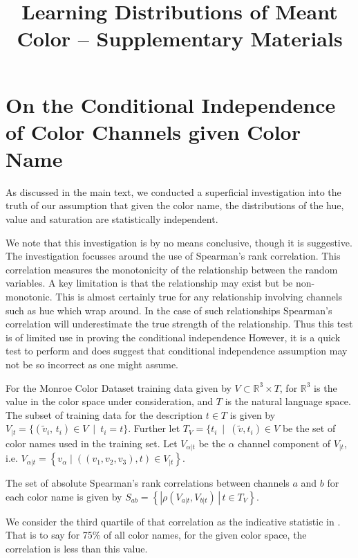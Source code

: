 \documentclass[11pt,letterpaper]{article}
\title{Learning Distributions of Meant Color -- Supplementary Materials}
\author{}
\date{}
\begin{document}
\maketitle

\section{On the Conditional Independence of Color Channels given Color Name}

As discussed in the main text, we conducted a superficial investigation into the truth of our assumption that given the color name, the distributions of the hue, value and saturation are statistically independent.

We note that this investigation is by no means conclusive, though it is suggestive.
The investigation focusses around the use of Spearman's rank correlation.
This correlation measures the monotonicity of the relationship between the random variables.
A key limitation is that the relationship may exist but be non-monotonic.
This is almost certainly true for any relationship involving channels such as hue which wrap around.
In the case of such relationships Spearman's correlation will underestimate the true strength of the relationship.
Thus this test is of limited use in proving the conditional independence
However, it is a quick test to perform and does suggest that conditional independence assumption may not be so incorrect as one might assume.


For the Monroe Color Dataset training data  given by $V \subset \mathbb{R}^{3}\times T$, for $\mathbb{R}^{3}$ is the value in the color space under consideration, and $T$ is the natural language space.
The subset of training data for the description $t \in T$ is given by
$V_{|t}=\{(\tilde{v}_i,\,t_i) \in V \: \mid \: t_{i}=t\}$.
Further let $T_V = \{t_i \: \mid \: (\tilde{v},t_i)\in V$ be the set of color names used in the training set.
Let $V_{\alpha|t}$ be the $\alpha$ channel component of $V_{|t}$, i.e. $V_{\alpha|t} = \left\lbrace v_\alpha \mid ((v_1,v_2,v_3), t) \in V_{|t} \right\rbrace$.

The set of absolute Spearman's rank correlations between channels $a$ and $b$ for each color name is given by
$S_{ab}=\left\lbrace \left|\rho(V_{a|t},V_{b|t})\,\right|\,t\in T_{V}\right\rbrace$.

We consider the third quartile of that correlation as the indicative statistic in .
That is to say for 75\% of all color names, for the given color space, the correlation is less than this value.
\end{document}
